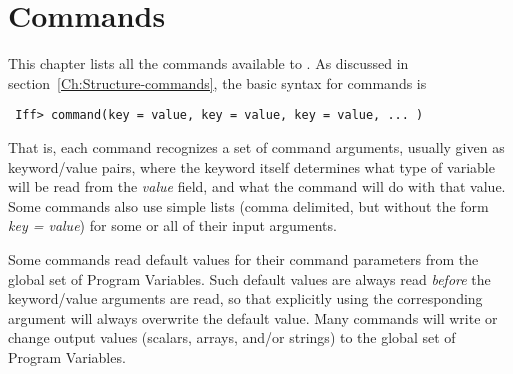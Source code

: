 

\section{Commands} \label{Ch:Commands} 

This chapter lists all the commands available to {\ifeffit}.  As discussed
in section~{\ref{Ch:Structure-commands}}, the basic syntax for 
{\ifeffit} commands is
\begin{verbatim}
 Iff> command(key = value, key = value, key = value, ... ) 
\end{verbatim}
\noindent
That is, each command recognizes a set of command arguments, usually given as
keyword/value pairs, where the keyword itself determines what type of variable
will be read from the {\emph{value}} field, and what the command will do with
that value.  Some commands also use simple lists (comma delimited, but without
the form {\emph{key = value}}) for some or all of their input arguments.

Some commands read default values for their command parameters from the global
set of Program Variables.  Such default values are always read {\emph{before}}
the keyword/value arguments are read, so that explicitly using the
corresponding argument will always overwrite the default value.  Many commands
will write or change output values (scalars, arrays, and/or strings) to the
global set of Program Variables.

